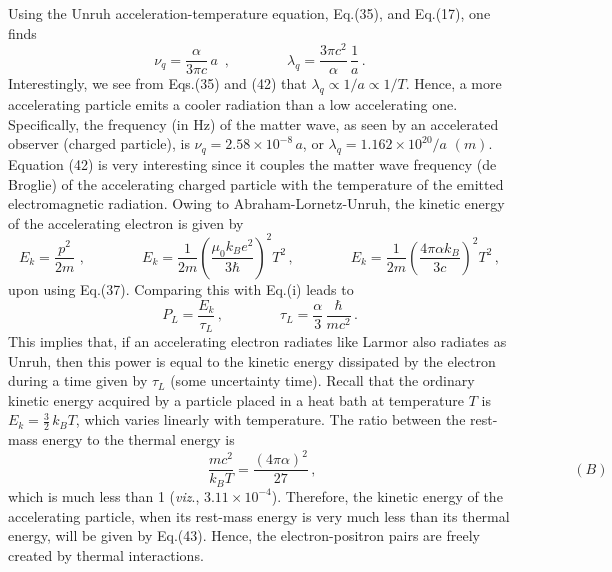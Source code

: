 \documentclass[a4]{epl2}
\begin{document}
Using the Unruh acceleration-temperature equation, Eq.(35), and Eq.(17), one finds
\begin{equation}
\nu_q=\frac{\alpha}{3\pi c}\, a\,\,\,,\qquad\qquad \lambda_q=\frac{3\pi c^2}{\alpha}\,\frac{1}{a}\,.
\end{equation}
Interestingly, we see from Eqs.(35) and (42) that $\lambda_q\propto 1/a\propto 1/T$. Hence, a more accelerating particle emits a cooler radiation than a low accelerating one. Specifically, the frequency (in Hz) of the  matter wave,  as seen by an accelerated observer (charged particle), is  $\nu_q=2.58\times 10^{-8}\,a $, or $\lambda_q=1.162\times 10^{20}/a\,\, (m)$. Equation (42) is very interesting since it couples the  matter wave frequency (de Broglie) of the accelerating charged particle with the temperature of the emitted electromagnetic radiation. Owing to Abraham-Lornetz-Unruh, the kinetic energy of the accelerating electron  is given by
\begin{equation}
E_k=\frac{p^2}{2m}\,\,,\qquad\qquad E_k=\frac{1}{2m}\left(\frac{\mu_0k_Be^2}{3\hbar}\right)^2T^2\,,\qquad\qquad E_k=\frac{1}{2m}\left(\frac{4\pi\alpha k_B}{3c}\right)^2T^2\,,
\end{equation}
upon using Eq.(37). Comparing this with Eq.(i) leads to
$$P_L=\frac{E_k}{\tau_L}\,,\qquad\qquad \tau_L=\frac{\alpha}{3}\,\frac{\hbar}{mc^2}\,.$$
This implies that, if an accelerating electron radiates like Larmor also radiates as Unruh, then this power is equal to the kinetic energy dissipated by the electron during a time given by $\tau_L$ (some uncertainty time). Recall that the ordinary kinetic energy acquired by a particle placed in a heat bath  at temperature $T$ is  $E_k=\frac{3}{2}\,k_BT$, which varies linearly with temperature. The ratio between the rest-mass energy to the thermal energy is
$$\hspace{6cm}\frac{mc^2}{k_BT}=\frac{(4\pi\alpha)^2}{27}\,,\qquad\qquad\hspace{6cm} (B)$$
which is much less than 1 (\emph{viz}., $3.11\times 10^{-4}$). Therefore, the kinetic energy of the accelerating particle, when its rest-mass energy is very much less than its thermal energy,  will be given by Eq.(43). Hence, the electron-positron pairs are freely created by thermal interactions.
\end{document}
